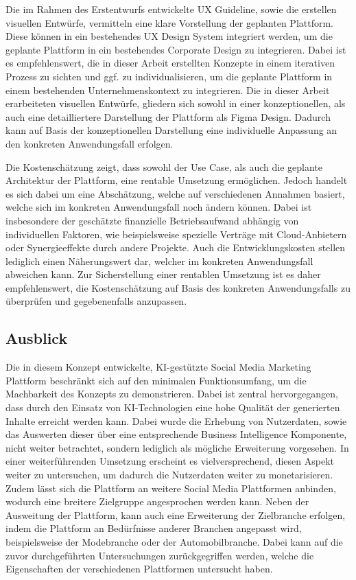 Die im Rahmen des Erstentwurfs entwickelte UX Guideline, sowie die erstellen visuellen Entwürfe, vermitteln eine klare Vorstellung der geplanten Plattform.
Diese können in ein bestehendes UX Design System integriert werden, um die geplante Plattform in ein bestehendes Corporate Design zu integrieren.
Dabei ist es empfehlenswert, die in dieser Arbeit erstellten Konzepte in einem iterativen Prozess zu sichten und ggf. zu individualisieren, um die geplante Plattform in einem bestehenden Unternehmenskontext zu integrieren.
Die in dieser Arbeit erarbeiteten visuellen Entwürfe, gliedern sich sowohl in einer konzeptionellen, als auch eine detailliertere Darstellung der Plattform als Figma Design.
Dadurch kann auf Basis der konzeptionellen Darstellung eine individuelle Anpassung an den konkreten Anwendungsfall erfolgen.

Die Kostenschätzung zeigt, dass sowohl der Use Case, als auch die geplante Architektur der Plattform, eine rentable Umsetzung ermöglichen.
Jedoch handelt es sich dabei um eine Abschätzung, welche auf verschiedenen Annahmen basiert, welche sich im konkreten Anwendungsfall noch ändern können.
Dabei ist insbesondere der geschätzte finanzielle Betriebsaufwand abhängig von individuellen Faktoren, wie beispielsweise spezielle Verträge mit Cloud-Anbietern oder Synergieeffekte durch andere Projekte.
Auch die Entwicklungskosten stellen lediglich einen Näherungswert dar, welcher im konkreten Anwendungsfall abweichen kann.
Zur Sicherstellung einer rentablen Umsetzung ist es daher empfehlenswert, die Kostenschätzung auf Basis des konkreten Anwendungsfalls zu überprüfen und gegebenenfalls anzupassen.

\subsection{Ausblick}
Die in diesem Konzept entwickelte, KI-gestützte Social Media Marketing Plattform beschränkt sich auf den minimalen Funktionsumfang, um die Machbarkeit des Konzepts zu demonstrieren.
Dabei ist zentral hervorgegangen, dass durch den Einsatz von KI-Technologien eine hohe Qualität der generierten Inhalte erreicht werden kann.
Dabei wurde die Erhebung von Nutzerdaten, sowie das Auswerten dieser über eine entsprechende Business Intelligence Komponente, nicht weiter betrachtet, sondern lediglich als mögliche Erweiterung vorgesehen.
In einer weiterführenden Umsetzung erscheint es vielversprechend, diesen Aspekt weiter zu untersuchen, um dadurch die Nutzerdaten weiter zu monetarisieren.
Zudem lässt sich die Plattform an weitere Social Media Plattformen anbinden, wodurch eine breitere Zielgruppe angesprochen werden kann.
Neben der Ausweitung der Plattform, kann auch eine Erweiterung der Zielbranche erfolgen, indem die Plattform an Bedürfnisse anderer Branchen angepasst wird, beispielsweise der Modebranche oder der Automobilbranche.
Dabei kann auf die zuvor durchgeführten Untersuchungen zurückgegriffen werden, welche die Eigenschaften der verschiedenen Plattformen untersucht haben.